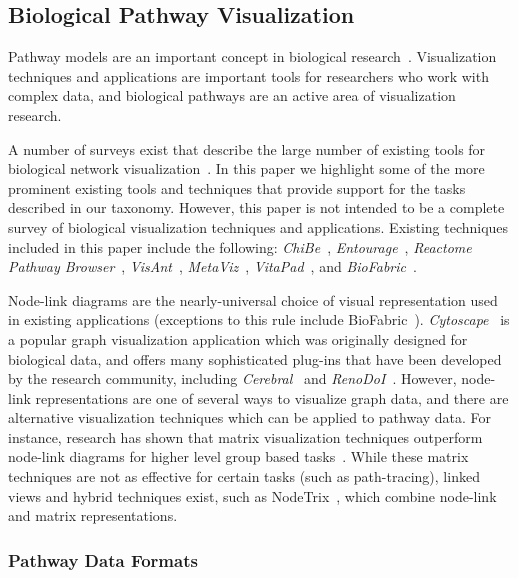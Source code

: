 \documentclass[twocolumn]{bmcart}%
\begin{document}
\subsection*{Biological Pathway Visualization}

Pathway models are an important concept in biological research~\cite{cairns2011regulation, luo2003targeting, reya2001stem}.
Visualization techniques and applications are important tools for researchers who work with complex data, and biological pathways are an active area of visualization research.

A number of surveys exist that describe the large number of existing tools for biological network visualization~\cite{Suderman2007tools,pavlopoulos2008survey,Gehlenborg2010omics}.
In this paper we highlight some of the more prominent existing tools and techniques that provide support for the tasks described in our taxonomy.
However, this paper is not intended to be a complete survey of biological visualization techniques and applications.
Existing techniques included in this paper include the following: \textit{ChiBe}~\cite{Babur2010chibe}, \textit{Entourage}~\cite{Lex2013entourage}, \textit{Reactome Pathway Browser}~\cite{croft2014reactome}, \textit{VisAnt}~\cite{hu2004visant}, \textit{MetaViz}~\cite{bourqui2007metabolic}, \textit{VitaPad}~\cite{holford2005vitapad}, and \textit{BioFabric}~\cite{Longabaugh2012biofabric}.

Node-link diagrams are the nearly-universal choice of visual representation used in existing applications (exceptions to this rule include BioFabric~\cite{Longabaugh2012biofabric}).
\textit{Cytoscape}~\cite{Shannon2003cytoscape} is a popular graph visualization application which was originally designed for biological data, and offers many sophisticated plug-ins that have been developed by the research community, including \textit{Cerebral}~\cite{Barsky2008cerebral} and \textit{RenoDoI}~\cite{Vehlow2015}.
However, node-link representations are one of several ways to visualize graph data, and there are alternative visualization techniques which can be applied to pathway data.
For instance, research has shown that matrix visualization techniques outperform node-link diagrams for higher level group based tasks~\cite{Ghoniem2004,Henry2007}.
While these matrix techniques are not as effective for certain tasks (such as path-tracing), linked views and hybrid techniques exist, such as NodeTrix~\cite{NodeTrix2007}, which combine node-link and matrix representations.

\subsubsection*{Pathway Data Formats}
\end{document}
